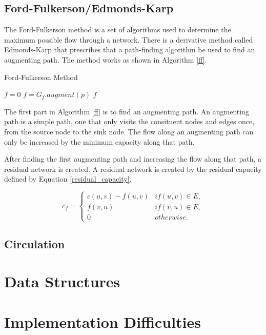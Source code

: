 \documentclass[conference]{IEEEtran}
\begin{document}
\subsection{Ford-Fulkerson/Edmonds-Karp}
The Ford-Fulkerson method is a set of algorithms used to determine the maximum 
possible flow through a network. There is a derivative method called Edmonds-Karp 
that prescribes that a path-finding algorithm be used to find an augmenting path. The method works as shown in Algorithm \ref{ff}.
 

\begin{algorithm}
\caption{Ford-Fulkerson Method \cite{b1}}\label{ff}
	\begin{algorithmic}
			\State $f = 0$
				\State $f = G_f.augment(p)$
			\EndWhile
			\State \Return $f$
		\EndFunction
	\end{algorithmic}
\end{algorithm}

The first part in Algorithm \ref{ff} is to find an augmenting path. An augmenting 
path is a simple path, one that only visits the consituent nodes and edges once, 
from the source node to the sink node. The flow along an augmenting path can only be 
increased by the minimum capacity along that path. 

After finding the first augmenting path and increasing the flow along that path, a 
residual network is created. A residual network is created by the residual capacity defined by Equation \ref{residual_capacity}.

\begin{equation}
\label{residual_capacity}
c_f = \begin{cases}
		c(u,v) - f(u,v) & if (u,v) \in E,\\
		f(v,u) & if (v,u) \in E,\\
		0 & otherwise.
	\end{cases}
\end{equation}

\subsection{Circulation}

\section{Data Structures}

\section{Implementation Difficulties}
\end{document}
